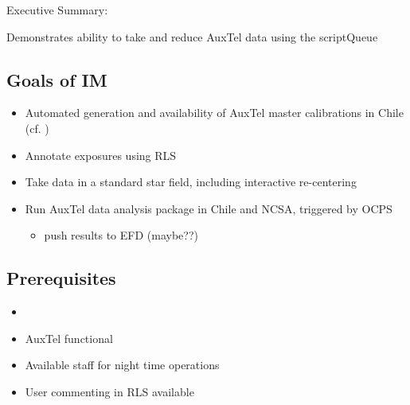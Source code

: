 
Executive Summary:

Demonstrates ability to take and reduce AuxTel data using the scriptQueue

\subsection{Goals of IM}
\begin{itemize}
\item Automated generation and availability of AuxTel master calibrations in Chile (cf. )
\item Annotate exposures using \gls{RLS}
\item Take data in a standard star field, including interactive re-centering
\item Run AuxTel data analysis package in Chile and NCSA, triggered by \gls{OCPS}
\begin{itemize}
\item push results to \gls{EFD} (maybe??)
\end{itemize}
\end{itemize}

\subsection{Prerequisites}
\begin{itemize}
\item{}
\item{AuxTel functional}
\item{Available staff for night time operations}
\item{User commenting in \gls{RLS} available}
\end{itemize}

